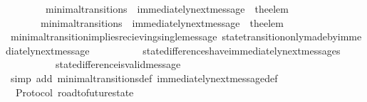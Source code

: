 \begin{isabellebody}
\ \ {\isachardoublequoteopen}{\isasymforall}\ {\isasymsigma}\ {\isasymsigma}{\isacharprime}{\isachardot}\ {\isacharparenleft}{\isasymsigma}{\isacharcomma}\ {\isasymsigma}{\isacharprime}{\isacharparenright}\ {\isasymin}\ minimal{\isacharunderscore}transitions\ {\isasymlongleftrightarrow}\ immediately{\isacharunderscore}next{\isacharunderscore}message\ {\isacharparenleft}{\isasymsigma}{\isacharcomma}\ the{\isacharunderscore}elem\ {\isacharparenleft}{\isasymsigma}{\isacharprime}{\isacharminus}\ {\isasymsigma}{\isacharparenright}{\isacharparenright}{\isachardoublequoteclose}\isanewline
%
\isadelimproof
%
\endisadelimproof
%
\isatagproof
{}\isamarkupfalse%
\ {\isacharminus}\isanewline
\ \ \isamarkupfalse%
\ {\isachardoublequoteopen}{\isasymforall}\ {\isasymsigma}\ {\isasymsigma}{\isacharprime}{\isachardot}\ {\isacharparenleft}{\isasymsigma}{\isacharcomma}\ {\isasymsigma}{\isacharprime}{\isacharparenright}\ {\isasymin}\ minimal{\isacharunderscore}transitions\ {\isasymlongrightarrow}\ immediately{\isacharunderscore}next{\isacharunderscore}message\ {\isacharparenleft}{\isasymsigma}{\isacharcomma}\ the{\isacharunderscore}elem\ {\isacharparenleft}{\isasymsigma}{\isacharprime}{\isacharminus}\ {\isasymsigma}{\isacharparenright}{\isacharparenright}{\isachardoublequoteclose}\isanewline
\ \ \ \ \isamarkupfalse%
\ minimal{\isacharunderscore}transition{\isacharunderscore}implies{\isacharunderscore}recieving{\isacharunderscore}single{\isacharunderscore}message\ state{\isacharunderscore}transition{\isacharunderscore}only{\isacharunderscore}made{\isacharunderscore}by{\isacharunderscore}immediately{\isacharunderscore}next{\isacharunderscore}message\isanewline
\ \ \ \ \ \ \ \ \ \ state{\isacharunderscore}differences{\isacharunderscore}have{\isacharunderscore}immediately{\isacharunderscore}next{\isacharunderscore}messages\isanewline
\ \ \ \ \ \ \ \ \ \ state{\isacharunderscore}difference{\isacharunderscore}is{\isacharunderscore}valid{\isacharunderscore}message\isanewline
\ \ \ \ \isamarkupfalse%
\ {\isacharparenleft}simp\ add{\isacharcolon}\ minimal{\isacharunderscore}transitions{\isacharunderscore}def\ immediately{\isacharunderscore}next{\isacharunderscore}message{\isacharunderscore}def{\isacharparenright}\isanewline
\ \ \ \ \isanewline
{}\isamarkupfalse%
%
\endisatagproof
{\isafoldproof}%
%
\isadelimproof
\isanewline
%
\endisadelimproof
\ \ \ \ \isanewline
\isanewline
{}\isamarkupfalse%
\ {\isacharparenleft}\ Protocol{\isacharparenright}\ road{\isacharunderscore}to{\isacharunderscore}future{\isacharunderscore}state\ {\isacharcolon}\isanewline

\end{isabellebody}
